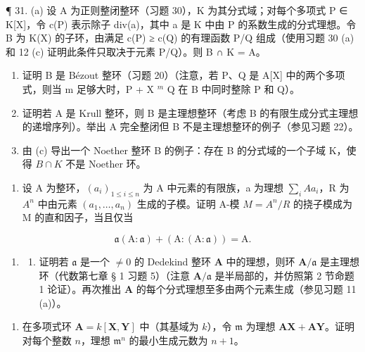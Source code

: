 ¶ 31. (a) 设 A 为正则整闭整环（习题 30），K 为其分式域；对每个多项式 P ∈ K{[}X{]}，令 c(P) 表示除子 div(a)，其中 a 是 K 中由 P 的系数生成的分式理想。令 B 为 K(X) 的子环，由满足 c(P) ≥ c(Q) 的有理函数 P/Q 组成（使用习题 30 (a) 和 12 (c) 证明此条件只取决于元素 P/Q）。则 B ∩ K = A。

\begin{enumerate}
\def\labelenumi{(\alph{enumi})}
\setcounter{enumi}{1}
\item
  证明 B 是 Bézout 整环（习题 20）（注意，若 P、Q 是 A{[}X{]} 中的两个多项式，则当 m 足够大时，P + X \(^{m}\) Q 在 B 中同时整除 P 和 Q）。
\item
  证明若 A 是 Krull 整环，则 B 是主理想整环（考虑 B 的有限生成分式主理想的递增序列）。举出 A 完全整闭但 B 不是主理想整环的例子（参见习题 22）。
\item
  由 (c) 导出一个 Noether 整环 B 的例子：存在 B 的分式域的一个子域 K，使得 \(B \cap K\) 不是 Noether 环。
\end{enumerate}

\begin{enumerate}
\def\labelenumi{\arabic{enumi}.}
\setcounter{enumi}{31}
\tightlist
\item
  设 A 为整环，\((a_{i})_{1 \leqslant i \leqslant n}\) 为 A 中元素的有限族，a 为理想 \(\sum_{i} A a_{i}\)，R 为 \(A^{n}\) 中由元素 \((a_{1}, \ldots, a_{n})\) 生成的子模。证明 A-模 \(M = A^{n}/R\) 的挠子模成为 M 的直和因子，当且仅当
\end{enumerate}

\[
\mathfrak {a} (\mathrm{A}: \mathfrak {a}) + (\mathrm{A}: (\mathrm{A}: \mathfrak {a})) = \mathrm{A}.
\]


\begin{enumerate}
\def\labelenumi{\arabic{enumi}.}
\tightlist
\item
  \begin{enumerate}
  \def\labelenumii{(\alph{enumii})}
  \tightlist
  \item
    证明若 \(\mathfrak{a}\) 是一个 \(\neq 0\) 的 Dedekind 整环 \(\mathbf{A}\) 中的理想，则环 \(\mathbf{A} / \mathfrak{a}\) 是主理想环（代数第七章 § 1 习题 5）（注意 \(\mathbf{A} / \mathfrak{a}\) 是半局部的，并仿照第 2 节命题 1 论证）。再次推出 \(\mathbf{A}\) 的每个分式理想至多由两个元素生成（参见习题 11 (a)）。
  \end{enumerate}
\end{enumerate}

\begin{enumerate}
\def\labelenumi{(\alph{enumi})}
\setcounter{enumi}{1}
\tightlist
\item
  在多项式环 \(\mathbf{A} = k[\mathbf{X},\mathbf{Y}]\) 中（其基域为 \(k\)），令 \(\mathfrak{m}\) 为理想 \(\mathbf{AX} + \mathbf{AY}\)。证明对每个整数 \(n\)，理想 \(\mathfrak{m}^n\) 的最小生成元数为 \(n + 1\)。
\end{enumerate}

